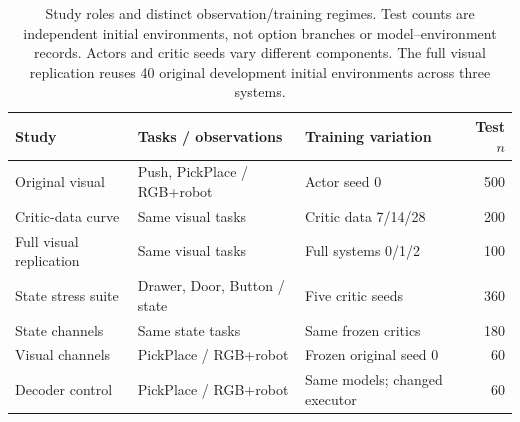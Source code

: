 \documentclass[10pt,a4paper]{article}
\begin{document}
\setcounter{table}{2}
\begin{table}[H]\centering\small
\caption{Study roles and distinct observation/training regimes. Test counts are independent initial environments, not option branches or model--environment records. Actors and critic seeds vary different components. The full visual replication reuses 40 original development initial environments across three systems.}
\setlength{\tabcolsep}{3pt}
\begin{tabular}{p{3.1cm}p{3.5cm}p{2.9cm}r}\toprule Study & Tasks / observations & Training variation & Test $n$\\\midrule
Original visual & Push, PickPlace / RGB+robot & Actor seed 0 & 500\\
Critic-data curve & Same visual tasks & Critic data 7/14/28 & 200\\
Full visual replication & Same visual tasks & Full systems 0/1/2 & 100\\
State stress suite & Drawer, Door, Button / state & Five critic seeds & 360\\
State channels & Same state tasks & Same frozen critics & 180\\
Visual channels & PickPlace / RGB+robot & Frozen original seed 0 & 60\\
Decoder control & PickPlace / RGB+robot & Same models; changed executor & 60\\\bottomrule
\end{tabular}
\end{table}
\end{document}
